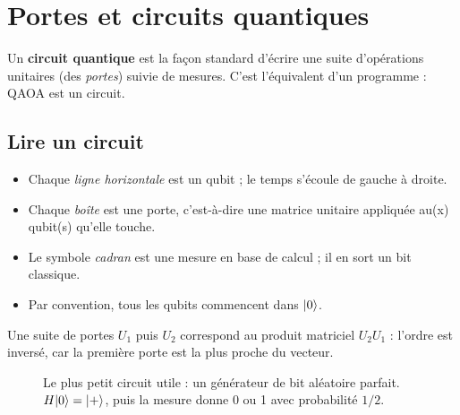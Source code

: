 \chapter{Portes et circuits quantiques}\label{ch:circuits}

Un \textbf{circuit quantique} est la façon standard d'écrire une suite d'opérations unitaires (des \emph{portes}) suivie de mesures. C'est l'équivalent d'un programme : QAOA est un circuit.

\section{Lire un circuit}
\begin{itemize}
\item Chaque \emph{ligne horizontale} est un qubit ; le temps s'écoule de gauche à droite.
\item Chaque \emph{boîte} est une porte, c'est-à-dire une matrice unitaire appliquée au(x) qubit(s) qu'elle touche.
\item Le symbole \emph{cadran} est une mesure en base de calcul ; il en sort un bit classique.
\item Par convention, tous les qubits commencent dans $\lvert 0\rangle$.
\end{itemize}
Une suite de portes $U_1$ puis $U_2$ correspond au produit matriciel $U_2U_1$ : l'ordre est inversé, car la première porte est la plus proche du vecteur.

\begin{figure}[htbp]
\centering
{}
\caption{Le plus petit circuit utile : un générateur de bit aléatoire parfait. $H\lvert 0\rangle=\lvert +\rangle$, puis la mesure donne 0 ou 1 avec probabilité $1/2$.}
\end{figure}

